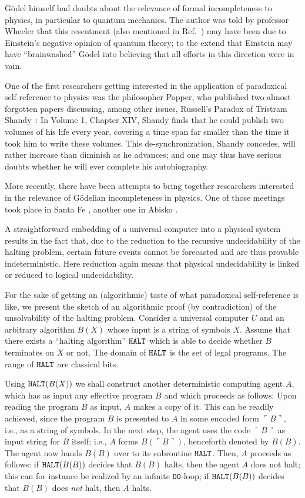 \documentclass[rmp,amsfonts,showpacs,showkeys,twocolumn]{revtex4}
\begin{document}
G\"odel himself had doubts about the relevance of formal incompleteness to physics,
in particular to quantum mechanics.
The author was told by professor Wheeler that this resentment
(also mentioned in Ref.~\cite[pp. 140-141]{bernstein})
may have been due to Einstein's negative opinion of quantum theory;
to the extend that Einstein may have ``brainwashed'' G\"odel
into believing that all efforts in this direction were in vain.

One of the first researchers getting interested in the application
of paradoxical self-reference to physics
was the philosopher Popper,
who published two almost forgotten papers
\cite{popper-50i,popper-50ii}
discussing, among other issues, Russell's Paradox of
Tristram Shandy~\cite{sterne}:
In Volume 1, Chapter XIV, Shandy finds that he could publish
two volumes of his life every year,
covering a time span far smaller than the time it took him to write
these volumes. This de-synchronization, Shandy concedes,
will rather increase than diminish as he advances; and one may thus have serious doubts
whether he will ever complete his autobiography.

More recently, there have been attempts to bring together researchers
interested in the relevance of G\"odelian incompleteness in physics.
One of those meetings took place in Santa Fe
\cite{casti:94-onlimits_book}, another one in Abisko
\cite{casti:96-onlimits}.

A straightforward embedding of a universal computer
into a physical system results in the fact that,
due to the reduction to the recursive undecidability of the halting problem,
certain future events cannot be forecasted
and are thus provable indeterministic.
Here reduction again means that physical undecidability is linked or reduced
to logical undecidability.

For the sake of getting an (algorithmic) taste
of what paradoxical self-reference is like,
we present the sketch of an algorithmic proof (by contradiction)
of the unsolvability of the halting problem.
Consider a universal computer $U$ and an arbitrary algorithm
$B(X)$ whose input is a string of symbols $X$.  Assume that there exists
a ``halting algorithm'' ${\tt HALT}$ which is able to decide whether $B$
terminates on $X$ or not.
The domain of ${\tt HALT}$  is the set of legal programs.
The range of ${\tt HALT}$ are classical bits.

Using ${\tt HALT}(B(X))$ we shall construct another deterministic
computing agent $A$, which has as input any effective program $B$ and
which proceeds as follows:  Upon reading the program $B$ as input, $A$
makes a copy of it.  This can be readily achieved, since the program $B$
is presented to $A$ in some encoded form
$\ulcorner B\urcorner $,
i.e., as a string of
symbols.  In the next step, the agent uses the code
$\ulcorner B\urcorner $
 as input
string for $B$ itself; i.e., $A$ forms  $B(\ulcorner B\urcorner )$,
henceforth denoted by
$B(B)$.  The agent now hands $B(B)$ over to its subroutine ${\tt HALT}$.
Then, $A$ proceeds as follows:  if ${\tt HALT}(B(B))$ decides that
$B(B)$ halts, then the agent $A$ does not halt; this can for instance be
realized by an infinite {\tt DO}-loop; if ${\tt HALT}(B(B))$ decides
that $B(B)$ does {\em not} halt, then $A$ halts.
\end{document}
